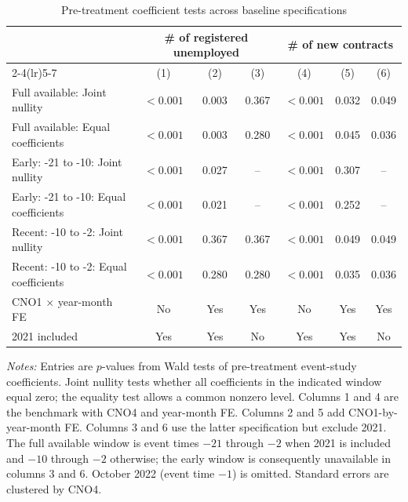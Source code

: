 \begin{table}[H]
\centering
\caption{Pre-treatment coefficient tests across baseline specifications}
\label{tab:v1_pretrends}
\begin{threeparttable}
\scriptsize
\renewcommand{\arraystretch}{0.90}
\setlength{\tabcolsep}{2.0pt}
\begin{tabular}{@{}lcccccc@{}}
\toprule
& \multicolumn{3}{c}{\# of registered unemployed} & \multicolumn{3}{c}{\# of new contracts} \\
\cmidrule(lr){2-4}\cmidrule(lr){5-7}
& (1) & (2) & (3) & (4) & (5) & (6) \\
\midrule
Full available: Joint nullity & $<0.001$ & 0.003 & 0.367 & $<0.001$ & 0.032 & 0.049 \\
Full available: Equal coefficients & $<0.001$ & 0.003 & 0.280 & $<0.001$ & 0.045 & 0.036 \\
Early: -21 to -10: Joint nullity & $<0.001$ & 0.027 & -- & $<0.001$ & 0.307 & -- \\
Early: -21 to -10: Equal coefficients & $<0.001$ & 0.021 & -- & $<0.001$ & 0.252 & -- \\
Recent: -10 to -2: Joint nullity & $<0.001$ & 0.367 & 0.367 & $<0.001$ & 0.049 & 0.049 \\
Recent: -10 to -2: Equal coefficients & $<0.001$ & 0.280 & 0.280 & $<0.001$ & 0.035 & 0.036 \\
\midrule
CNO1 $\times$ year-month FE & No & Yes & Yes & No & Yes & Yes \\
2021 included & Yes & Yes & No & Yes & Yes & No \\
\bottomrule
\end{tabular}
\begin{tablenotes}[flushleft]
\footnotesize
\item \emph{Notes:} Entries are $p$-values from Wald tests of pre-treatment event-study coefficients. Joint nullity tests whether all coefficients in the indicated window equal zero; the equality test allows a common nonzero level. Columns 1 and 4 are the benchmark with CNO4 and year-month FE. Columns 2 and 5 add CNO1-by-year-month FE. Columns 3 and 6 use the latter specification but exclude 2021. The full available window is event times $-21$ through $-2$ when 2021 is included and $-10$ through $-2$ otherwise; the early window is consequently unavailable in columns 3 and 6. October 2022 (event time $-1$) is omitted. Standard errors are clustered by CNO4.
\end{tablenotes}
\end{threeparttable}
\end{table}
